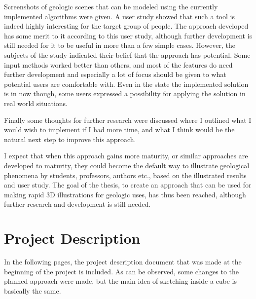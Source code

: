 \documentclass[a4paper,12pt]{report}
\begin{document}
Screenshots of geologic scenes that can be modeled using the currently implemented algorithms were given. A user study showed that such a tool is indeed highly interesting for the target group of people. The approach developed has some merit to it according to this user study, although further development is still needed for it to be useful in more than a few simple cases. However, the subjects of the study indicated their belief that the approach has potential. Some input methods worked better than others, and most of the features do need further development and especially a lot of focus should be given to what potential users are comfortable with. Even in the state the implemented solution is in now though, some users expressed a possibility for applying the solution in real world situations.

Finally some thoughts for further research were discussed where I outlined what I would wish to implement if I had more time, and what I think would be the natural next step to improve this approach.

I expect that when this approach gains more maturity, or similar approaches are developed to maturity, they could become the default way to illustrate geological phenomena by students, professors, authors etc., based on the illustrated results and user study. The goal of the thesis, to create an approach that can be used for making rapid 3D illustrations for geologic uses, has thus been reached, although further research and development is still needed.


{}


\appendix
\chapter{Project Description}
\label{apx:description}
In the following pages, the project description document that was made at the beginning of the project is included. As can be observed, some changes to the planned approach were made, but the main idea of sketching inside a cube is basically the same.

\end{document}
